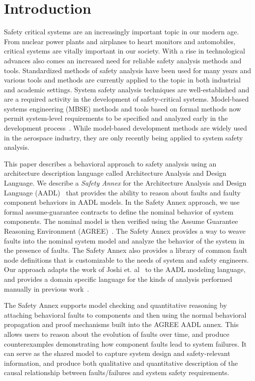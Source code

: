 \section{Introduction}
\label{sec:intro}
Safety critical systems are an increasingly important topic in our modern age. From nuclear power plants and airplanes to heart monitors and automobiles, critical systems are vitally important in our society. With a rise in technological advances also comes an increased need for reliable safety analysis methods and tools. Standardized methods of safety analysis have been used for many years and various tools and methods are currently applied to the topic in both industrial and academic settings. System safety analysis techniques are well-established and are a required activity in the development of safety-critical systems. Model-based systems engineering (MBSE) methods and tools based on formal methods now permit system-level requirements to be specified and analyzed early in the development process~\cite{NFM2012:CoGaMiWhLaLu,CAV2015:BoCiGrMa}. While model-based development methods are widely used in the aerospace industry, they are only recently being applied to system safety analysis.  

This paper describes a behavioral approach to safety analysis using an architecture description language called Architecture Analysis and Design Language. We describe a {\em Safety Annex} for the Architecture Analysis and Design Language (AADL)~\cite{FeilerModelBasedEngineering2012} that provides the ability to reason about faults and faulty component behaviors in AADL models. In the Safety Annex approach, we use formal assume-guarantee contracts to define the nominal behavior of system components. The nominal model is then verified using the Assume Guarantee Reasoning Environment (AGREE)~\cite{NFM2012:CoGaMiWhLaLu}. The Safety Annex  provides a way to weave faults into the nominal system model and analyze the behavior of the system in the presence of faults. The Safety Annex also provides a library of common fault node definitions that is customizable to the needs of system and safety engineers. Our approach adapts the work of Joshi et. al~\cite{Joshi05:Dasc} to the AADL modeling language, and provides a domain specific language for the kinds of analysis performed manually in previous work~\cite{Stewart17:IMBSA}. 


The Safety Annex supports model checking and quantitative reasoning by attaching behavioral faults to components and then using the normal behavioral propagation and proof mechanisms built into the AGREE AADL annex. This allows users to reason about the evolution of faults over time, and produce counterexamples demonstrating how component faults lead to system failures. It can serve as the shared model to capture system design and safety-relevant information, and produce both qualitative and quantitative description of the causal relationship between faults/failures and system safety requirements.

